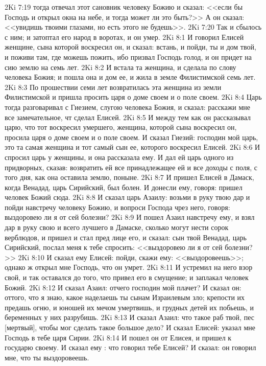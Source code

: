 \vs 2Ki 7:19 тогда отвечал этот сановник человеку Божию и сказал: <<если бы Господь и открыл окна на небе, и тогда может ли это быть?>> А он сказал: <<увидишь твоими глазами, но есть этого не будешь>>.
\vs 2Ki 7:20 Так и сбылось с ним; и затоптал его народ в воротах, и он умер.
\vs 2Ki 8:1 И говорил Елисей женщине, сына которой воскресил он, и сказал: встань, и пойди, ты и дом твой, и поживи там, где можешь пожить, ибо призвал Господь голод, и он придет на сию землю на семь лет.
\vs 2Ki 8:2 И встала та женщина, и сделала по слову человека Божия; и пошла она и дом ее, и жила в земле Филистимской семь лет.
\vs 2Ki 8:3 По прошествии семи лет возвратилась эта женщина из земли Филистимской и пришла просить царя о доме своем и о поле своем.
\vs 2Ki 8:4 Царь тогда разговаривал с Гиезием, слугою человека Божия, и сказал: расскажи мне все замечательное, чт сделал Елисей.
\vs 2Ki 8:5 И между тем как он рассказывал царю, что тот воскресил умершего, женщина, которой сына воскресил он, просила царя о доме своем и о поле своем. И сказал Гиезий: господин мой царь, это та самая женщина и тот самый сын ее, которого воскресил Елисей.
\vs 2Ki 8:6 И спросил царь у женщины, и она рассказала ему. И дал ей царь одного из придворных, сказав: возвратить ей все принадлежащее ей и все доходы с поля, с того дня, как она оставила землю, поныне.
\rsbpar\vs 2Ki 8:7 И пришел Елисей в Дамаск, когда Венадад, царь Сирийский, был болен. И донесли ему, говоря: пришел человек Божий сюда.
\vs 2Ki 8:8 И сказал царь Азаилу: возьми в руку твою дар и пойди навстречу человеку Божию, и вопроси Господа чрез него, говоря: выздоровею ли я от сей болезни?
\vs 2Ki 8:9 И пошел Азаил навстречу ему, и взял дар в руку свою и всего лучшего в Дамаске, сколько могут нести сорок верблюдов, и пришел и стал пред лице его, и сказал: сын твой Венадад, царь Сирийский, послал меня к тебе спросить: <<выздоровею ли я от сей болезни?>>
\vs 2Ki 8:10 И сказал ему Елисей: пойди, скажи ему: <<выздоровеешь>>; однако ж открыл мне Господь, что он умрет.
\vs 2Ki 8:11 И устремил на него  взор свой, и так оставался до того, что привел его в смущение; и заплакал человек Божий.
\vs 2Ki 8:12 И сказал Азаил: отчего господин мой плачет? И сказал он: оттого, что я знаю, какое наделаешь ты сынам Израилевым зло; крепости их предашь огню, и юношей их мечом умертвишь, и грудных детей их побьешь, и беременных  у них разрубишь.
\vs 2Ki 8:13 И сказал Азаил: что такое раб твой, пес [мертвый], чтобы мог сделать такое большое дело? И сказал Елисей: указал мне Господь в тебе царя Сирии.
\vs 2Ki 8:14 И пошел он от Елисея, и пришел к государю своему. И сказал ему : что говорил тебе Елисей? И сказал: он говорил мне, что ты выздоровеешь.
